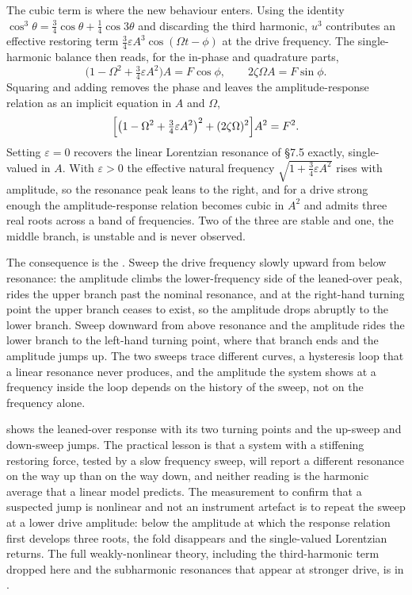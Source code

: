 The cubic term is where the new behaviour enters. Using the identity
$\cos^{3}\theta = \tfrac{3}{4}\cos\theta + \tfrac{1}{4}\cos 3\theta$
and discarding the third harmonic, $u^{3}$ contributes an effective
restoring term $\tfrac{3}{4}\varepsilon A^{3}\cos(\Omega t - \phi)$ at
the drive frequency. The single-harmonic balance then reads, for the
in-phase and quadrature parts,
\[
\bigl(1 - \Omega^{2} + \tfrac{3}{4}\varepsilon A^{2}\bigr) A = F \cos\phi,
\qquad
2\zeta \Omega A = F \sin\phi.
\]
Squaring and adding removes the phase and leaves the amplitude-response
relation as an implicit equation in $A$ and $\Omega$,
\[
\Bigl[\bigl(1 - \Omega^{2} + \tfrac{3}{4}\varepsilon A^{2}\bigr)^{2}
+ (2\zeta \Omega)^{2}\Bigr] A^{2} = F^{2}.
\]
Setting $\varepsilon = 0$ recovers the linear Lorentzian resonance of
\S7.5 exactly, single-valued in $A$. With $\varepsilon > 0$ the
effective natural frequency $\sqrt{1 + \tfrac{3}{4}\varepsilon A^{2}}$
rises with amplitude, so the resonance peak leans to the right, and for
a drive strong enough the amplitude-response relation becomes cubic in
$A^{2}$ and admits three real roots across a band of frequencies. Two
of the three are stable and one, the middle branch, is unstable and is
never observed.

The consequence is the . Sweep the drive
frequency slowly upward from below resonance: the amplitude climbs the
lower-frequency side of the leaned-over peak, rides the upper branch
past the nominal resonance, and at the right-hand turning point the
upper branch ceases to exist, so the amplitude drops abruptly to the
lower branch. Sweep downward from above resonance and the amplitude
rides the lower branch to the left-hand turning point, where that branch
ends and the amplitude jumps up. The two sweeps trace different curves,
a hysteresis loop that a linear resonance never produces, and the
amplitude the system shows at a frequency inside the loop depends on the
history of the sweep, not on the frequency alone.



 shows the leaned-over response
with its two turning points and the up-sweep and down-sweep jumps. The
practical lesson is that a system with a stiffening restoring force,
tested by a slow frequency sweep, will report a different resonance on
the way up than on the way down, and neither reading is the harmonic
average that a linear model predicts. The measurement to confirm that a
suspected jump is nonlinear and not an instrument artefact is to repeat
the sweep at a lower drive amplitude: below the amplitude at which the
response relation first develops three roots, the fold disappears and
the single-valued Lorentzian returns. The full weakly-nonlinear theory,
including the third-harmonic term dropped here and the subharmonic
resonances that appear at stronger drive, is in
\textcite{text:v2ch07-strogatz-nonlinear}.

